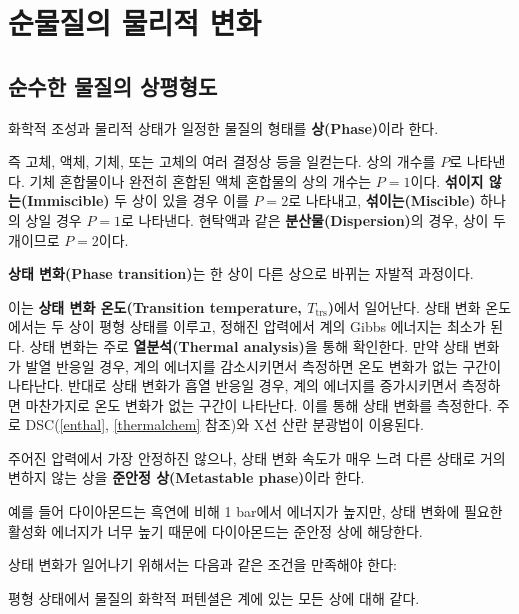 \chapter{순물질의 물리적 변화}
    \section{순수한 물질의 상평형도}
        \begin{defn}[상(Phase)]
            화학적 조성과 물리적 상태가 일정한 물질의 형태를 \textbf{상(Phase)}이라 한다.
        \end{defn}
        즉 고체, 액체, 기체, 또는 고체의 여러 결정상 등을 일컫는다. 상의 개수를 $P$로 나타낸다. 기체 혼합물이나 완전히 혼합된 액체 혼합물의 상의 개수는 
        $P=1$이다. \textbf{섞이지 않는(Immiscible)} 두 상이 있을 경우 이를 $P=2$로 나타내고, \textbf{섞이는(Miscible)} 하나의 상일 경우  
        $P=1$로 나타낸다. 현탁액과 같은 \textbf{분산물(Dispersion)}의 경우, 상이 두 개이므로 $P=2$이다.
        \par \begin{defn}[상태 변화]
        \textbf{상태 변화(Phase transition)}는 한 상이 다른 상으로 바뀌는 자발적 과정이다.
        \end{defn}이는 \textbf{상태 변화 온도(Transition temperature, $T_\mathrm{trs}$)}에서 일어난다. 상태 변화 온도에서는 두 상이 평형 상태를 
        이루고, 정해진 압력에서 계의 Gibbs 에너지는 최소가 된다. 상태 변화는 주로 \textbf{열분석(Thermal analysis)}을 통해 
        확인한다. 만약 상태 변화가 발열 반응일 경우, 계의 에너지를 감소시키면서 측정하면 온도 변화가 없는 구간이 나타난다. 반대로 
        상태 변화가 흡열 반응일 경우, 계의 에너지를 증가시키면서 측정하면 마찬가지로 온도 변화가 없는 구간이 나타난다. 이를 통해 
        상태 변화를 측정한다. 주로 DSC(\ref{enthal}, \ref{thermalchem} 참조)와 X선 산란 분광법이 이용된다.
        \par \begin{defn}[준안정 상]
        주어진 압력에서 가장 안정하진 않으나, 상태 변화 속도가 매우 느려 다른 상태로 거의 변하지 않는 상을 
        \textbf{준안정 상(Metastable phase)}이라 한다.
        \end{defn}
        예를 들어 다이아몬드는 흑연에 비해 1 bar에서 에너지가 높지만, 상태 
        변화에 필요한 활성화 에너지가 너무 높기 때문에 다이아몬드는 준안정 상에 해당한다.
        \par 상태 변화가 일어나기 위해서는 다음과 같은 조건을 만족해야 한다:
        \begin{rem}[상태 변화의 조건]
            평형 상태에서 물질의 화학적 퍼텐셜은 계에 있는 모든 상에 대해 같다. 
        \end{rem}
